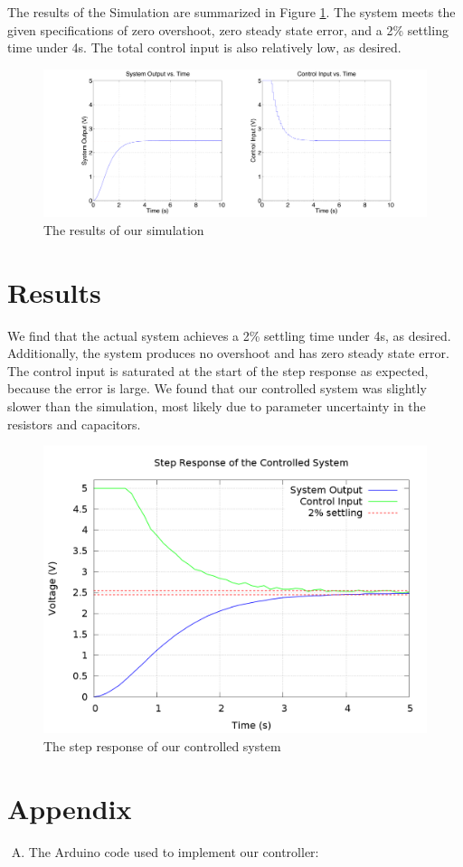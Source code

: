 \documentclass[11pt]{article}
\begin{document}
The results of the Simulation are summarized in Figure \ref{fig:sim_results}.
The system meets the given specifications of zero overshoot, zero steady state error, and a 2\% settling time under 4s.
The total control input is also relatively low, as desired.

\begin{figure}[h]
\centering
\includegraphics[width = 0.95\linewidth]{sim_results}
\caption{The results of our simulation}\label{fig:sim_results}
\end{figure}

\section*{Results}

We find that the actual system achieves a 2\% settling time under 4s, as desired.
Additionally, the system produces no overshoot and has zero steady state error.
The control input is saturated at the start of the step response as expected, because the error is large.
We found that our controlled system was slightly slower than the simulation, most likely due to parameter uncertainty in the resistors and capacitors. 

\begin{figure}[h]
\centering
\includegraphics[width = 0.7\linewidth]{results}
\caption{The step response of our controlled system}\label{fig:results}
\end{figure}

\pagebreak
\section*{Appendix}
\begin{enumerate}[A.]
\item The Arduino code used to implement our controller: 
\footnotesize

\normalsize
\end{enumerate}
\end{document}
